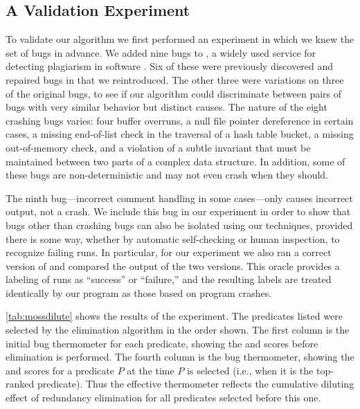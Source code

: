 \subsection{A Validation Experiment}

To validate our algorithm we first performed an experiment in which we
knew the set of bugs in advance.  We added nine bugs to \moss, a
widely used service for detecting plagiarism in software
\cite{Schleimer:2003:WLA}.  Six of these were previously discovered
and repaired bugs in \moss that we reintroduced.  The other three were
variations on three of the original bugs, to see if our algorithm could
discriminate between pairs of bugs with very similar behavior but
distinct causes.  The nature of the eight crashing bugs varies: four
buffer overruns, a null file pointer dereference in certain cases, a
missing end-of-list check in the traversal of a hash table bucket, a missing
out-of-memory check, and a violation of a subtle invariant that must be maintained between two
parts of a complex data structure.  In addition, some of these bugs
are non-deterministic and may not even crash when they should.

The ninth bug---incorrect comment handling in some cases---only
causes incorrect output, not a crash.  We include this bug in our
experiment in order to show that bugs other than crashing bugs can 
also be isolated using our techniques, provided there is some 
way, whether by automatic self-checking or human inspection, to recognize
failing runs.  In particular, for our experiment we also ran a correct 
version of \moss{} and compared the output of the two versions. 
This oracle provides a labeling of runs as ``success'' or ``failure,'' 
and the resulting labels are treated identically by our program as
those based on program crashes.



\autoref{tab:mossdilute} shows the results of the experiment.  The
predicates listed were selected by the elimination algorithm in the
order shown.  The first column is the initial bug thermometer for each
predicate, showing the \context{} and \increase{} scores before
elimination is performed. The fourth column is the 
bug thermometer, showing the \context{} and \increase{} scores for a
predicate $P$ at the time $P$ is selected (i.e., when it is the
top-ranked predicate).  Thus the effective thermometer reflects the
cumulative diluting effect of redundancy elimination for all
predicates selected before this one.

